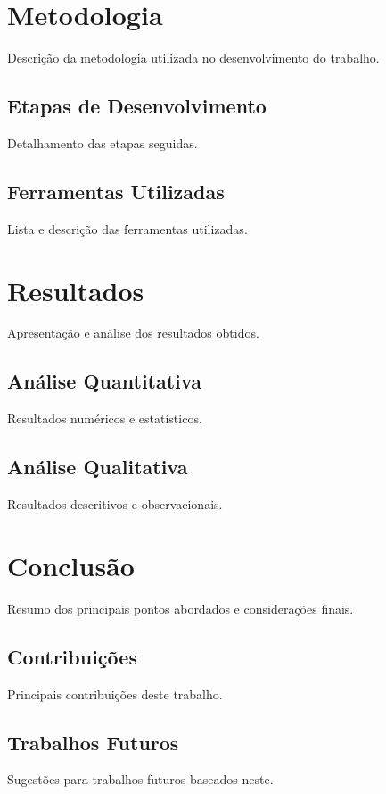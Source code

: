 \documentclass{article}
\begin{document}
\section{Metodologia}
Descrição da metodologia utilizada no desenvolvimento do trabalho.

\subsection{Etapas de Desenvolvimento}
Detalhamento das etapas seguidas.

\subsection{Ferramentas Utilizadas}
Lista e descrição das ferramentas utilizadas.

\section{Resultados}
Apresentação e análise dos resultados obtidos.

\subsection{Análise Quantitativa}
Resultados numéricos e estatísticos.

\subsection{Análise Qualitativa}
Resultados descritivos e observacionais.

\section{Conclusão}
Resumo dos principais pontos abordados e considerações finais.

\subsection{Contribuições}
Principais contribuições deste trabalho.

\subsection{Trabalhos Futuros}
Sugestões para trabalhos futuros baseados neste.
\end{document}
